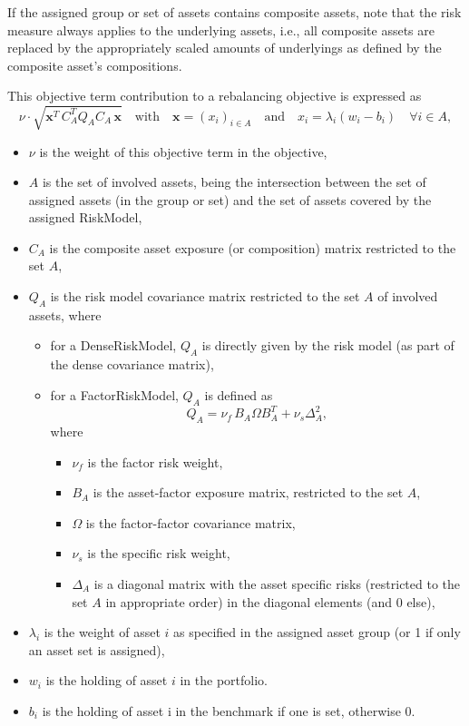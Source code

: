 		If the assigned group or set of assets contains composite assets, 
      note that the risk measure always applies to the underlying assets, 
      i.e., all composite assets are replaced by the appropriately scaled amounts of underlyings 
      as defined by the composite asset's compositions. 
		
		This objective term contribution to a rebalancing objective is expressed as 
      \[
          \nu\cdot\sqrt{\mathbf{x}^T\,C_A^T Q_A C_A\, \mathbf{x}} \quad 
          \text{with}\quad \mathbf{x}=\left(x_i\right)_{i\in A}   \quad
          \text{and} \quad x_i=\lambda_i(w_i-b_i) \quad \forall i\in A,
      \]
     \begin{itemize}
		  \item $\nu$ is the weight of this objective term in the objective, 
        \item $A$ is the set of involved assets, being the intersection between the set of assigned assets (in the group or set)
              and the set of assets covered by the assigned RiskModel, 
        \item $C_A$ is the composite asset exposure (or composition) matrix restricted to the set $A$, 
        \item $Q_A$ is the risk model covariance matrix restricted to the set $A$ of involved assets, where
            \begin{itemize}
               \item for a DenseRiskModel, $Q_A$ is directly given by the risk model (as part of the dense covariance matrix), 
               \item for a FactorRiskModel, $Q_A$ is defined as
                   \[
                       Q_A = \nu_f\,B_A\Omega B_A^T +\nu_s\Delta^2_A,
                   \]
                    where
                    \begin{itemize}
								\item $\nu_f$ is the factor risk weight, 
								\item $B_A$ is the asset-factor exposure matrix, restricted to the set $A$, 
								\item $\Omega$ is the factor-factor covariance matrix, 
								\item $\nu_s$ is the specific risk weight, 
								\item $\Delta_A$ is a diagonal matrix with the asset specific risks
                             (restricted to the set $A$ in appropriate order) in the diagonal elements (and 0 else), 
                    \end{itemize}
            \end{itemize}
         \item $\lambda_i$ is the weight of asset $i$ as specified in the assigned asset group (or 1 if only an asset set is assigned), 
         \item $w_i$ is the holding of asset $i$ in the portfolio. 
         \item $b_i$ is the holding of asset i in the benchmark if one is set, otherwise 0. 
     \end{itemize}

